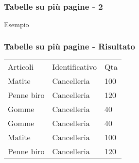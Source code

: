 \begin{frame}[fragile]
 
 \frametitle{Tabelle su più pagine - 2}
 
 \begin{esempio}{Esempio}
 \end{esempio}
\end{frame}
 
\begin{frame}
 
\frametitle{Tabelle su più pagine - Risultato}
\begin{center}
\begin{longtable}{lll} %
Articoli      & Identificativo & Qta    \\
Matite        & Cancelleria    & 100    \\
Penne biro    & Cancelleria    & 120    \\
Gomme         & Cancelleria    & 40     \\
Gomme         & Cancelleria    & 40     \\
Matite        & Cancelleria    & 100    \\
Penne biro    & Cancelleria    & 120    
\end{longtable}
\end{center}

\end{frame}
